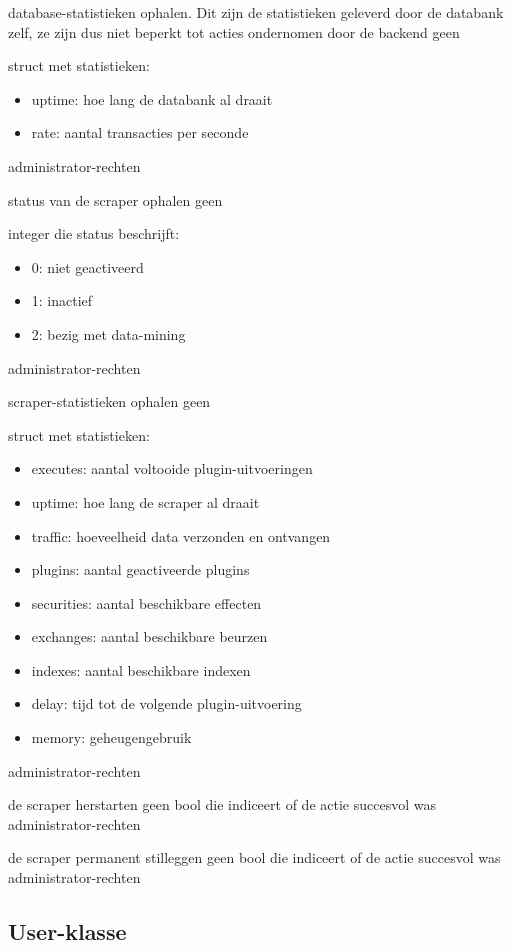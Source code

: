 	{ database-statistieken ophalen. Dit zijn de statistieken geleverd door de databank zelf, ze zijn dus niet beperkt tot acties ondernomen door de backend }
	{ geen }
	{ struct met statistieken:
		\begin{itemize}
		\item{uptime: hoe lang de databank al draait}
		\item{rate: aantal transacties per seconde}
		\end{itemize} }
	{ administrator-rechten }

	{ status van de scraper ophalen }
	{ geen }
	{ integer die status beschrijft:
		\begin{itemize}
		\item{0: niet geactiveerd}
		\item{1: inactief}
		\item{2: bezig met data-mining}
		\end{itemize} }
	{ administrator-rechten }

	{ scraper-statistieken ophalen }
	{ geen }
	{ struct met statistieken:
		\begin{itemize}
		\item{executes: aantal voltooide plugin-uitvoeringen}
		\item{uptime: hoe lang de scraper al draait}
		\item{traffic: hoeveelheid data verzonden en ontvangen}
		\item{plugins: aantal geactiveerde plugins}
		\item{securities: aantal beschikbare effecten}
		\item{exchanges: aantal beschikbare beurzen}
		\item{indexes: aantal beschikbare indexen}
		\item{delay: tijd tot de volgende plugin-uitvoering}
		\item{memory: geheugengebruik}
		\end{itemize} }
	{ administrator-rechten }

	{ de scraper herstarten }
	{ geen }
	{ bool die indiceert of de actie succesvol was }
	{ administrator-rechten }

	{ de scraper permanent stilleggen }
	{ geen }
	{ bool die indiceert of de actie succesvol was }
	{ administrator-rechten }


\subsection{User-klasse}

